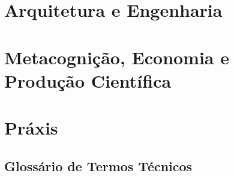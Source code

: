 \documentclass[12pt,a4paper,oneside]{book}
\begin{document}
\part{Arquitetura e Engenharia}






\part{Metacognição, Economia e Produção Científica}





\part{Práxis}



\appendix
\chapter{Glossário de Termos Técnicos}
\end{document}

